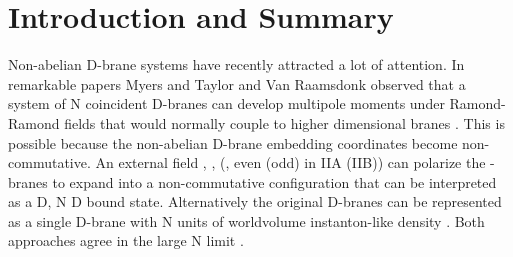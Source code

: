 \documentclass[12pt,a4paper]{article}
\begin{document}
\newpage







\section{Introduction and Summary}


Non-abelian D-brane systems have recently attracted a lot of attention. 
In remarkable papers Myers and Taylor and Van Raamsdonk
observed that a system of N coincident D\coordHE{}-branes can develop 
multipole moments under 
Ramond-Ramond fields that would normally couple to higher dimensional branes
\cite{Myers} \cite{TvR}.
This is possible because the non-abelian D\coordHE{}-brane embedding 
coordinates become non-commutative. An external field \coordHE{}, \coordHE{},
(\coordHE{}, \coordHE{} even (odd) in IIA (IIB))
can polarize the \coordHE{}-branes to expand into a non-commutative 
configuration that can be interpreted as a D\coordHE{}, N D\coordHE{} bound state.
Alternatively the original D\coordHE{}-branes can be represented as a 
single D\coordHE{}-brane with N units of 
worldvolume instanton-like density \cite{Douglas}.
Both approaches agree in the large N limit \cite{Myers,CMT}.
\end{document}
